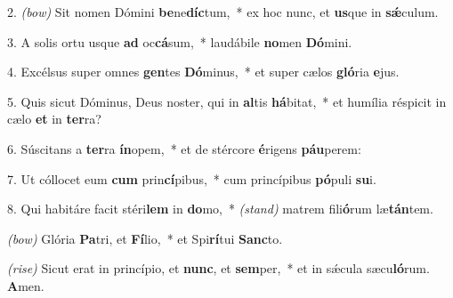  2. \textit{(bow)} Sit nomen Dómini \textbf{be}ne\-\textbf{díc}tum,~*
	ex hoc nunc, et \textbf{us}que in \textbf{s\'{\ae}}culum.

 3. A solis ortu usque \textbf{ad} oc\textbf{cá}sum,~*
	laudábile \textbf{no}men \textbf{Dó}mini.

 4. Excélsus super omnes \textbf{gen}tes \textbf{Dó}\-minus,~*
	et super cælos \textbf{gló}ria \textbf{e}jus.

 5. Quis sicut Dóminus, Deus noster, qui in \textbf{al}tis \textbf{há}bitat,~*
	et humília réspicit in cælo \textbf{et} in \textbf{ter}ra?

 6. Súscitans a \textbf{ter}ra \textbf{ín}opem,~*
	et de stércore \textbf{é}rigens \textbf{páu}perem:

 7. Ut cóllocet eum \textbf{cum} prin\textbf{cí}pi\-bus,~*
	cum princípibus \textbf{pó}puli \textbf{su}i.

 8. Qui habitáre facit stéri\textbf{lem} in \textbf{do}\-mo,~* {\color{red}\textit{(stand)}}
	matrem fili\textbf{ó}rum læ\textbf{tán}tem.
	
{\color{red}\textit{(bow)}} Glória \textbf{Pa}tri, et \textbf{Fí}lio,~*
	et Spi\textbf{rí}tui \textbf{Sanc}to.

{\color{red}\textit{(rise)}} Sicut erat in princípio, et \textbf{nunc}, et \textbf{sem}per,~*
	et in s\'{\ae}cula sæcu\textbf{ló}rum. \textbf{A}men.